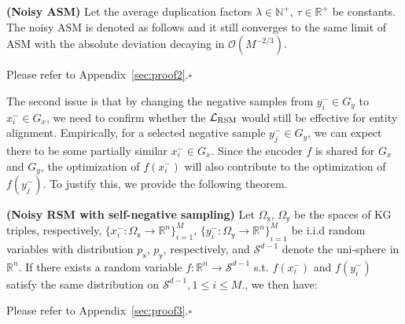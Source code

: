 \begin{theorem}{\bf (Noisy ASM)} \label{th:nasm}
Let the average duplication factors $\lambda\in\mathbb{N}^+$, $\tau\in\mathbb{R}^+$ be constants. The noisy ASM is denoted as follows and it still converges to the same limit of ASM with the absolute deviation decaying in $\mathcal{O}(M^{-2/3})$.


\end{theorem}
\begin{pf}
Please refer to Appendix~\ref{sec:proof2}.\hfill$\square$
\end{pf}


The second issue is that by changing the negative samples from $y_i^-\in G_y$ to $x_i^-\in G_x$, we need to confirm whether the $\mathcal{L}_{\rm RSM}$ would still be effective for entity alignment. 
Empirically, for a selected negative sample $y_j^-\in {G_y}$, we can expect there to be some partially similar $x_i^-\in G_x$. 
Since the encoder $f$ is shared for ${G_x}$ and ${G_y}$, the optimization of $f(x_i^-)$ will also contribute to the optimization of $f(y_j^-)$. 
To justify this, we provide the following theorem. 

\begin{theorem}{\bf (Noisy RSM with self-negative sampling)}
Let $\Omega_{\mathsf x}$, $\Omega_{\mathsf y}$ be the spaces of KG triples, respectively,  ${\{x^-_i:\Omega_{\mathsf x}\to\mathbb{R}^n\}}_{i=1}^M$, ${\{y^-_i:\Omega_{\mathsf y}\to\mathbb{R}^n\}}_{i=1}^M$ be i.i.d random variables with distribution $p_{\mathsf x}$, $p_{\mathsf y}$, respectively, 
and $\mathcal{S}^{d-1}$ denote the uni-sphere in $\mathbb{R}^n$. 
If there exists a random variable  $f:\mathbb{R}^n\to\mathcal{S}^{d-1}$ s.t. $f(x_i^-)$ and $f(y_i^-)$ satisfy the same distribution on $\mathcal{S}^{d-1}, 1\le i\le M.$, we then have: 
\end{theorem}
\begin{pf}
Please refer to Appendix~\ref{sec:proof3}.\hfill$\square$
\end{pf}

